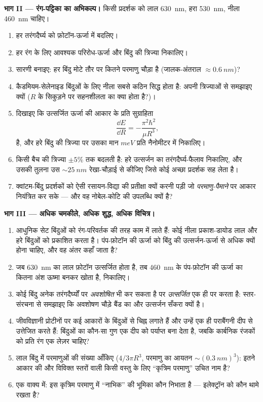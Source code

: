 \begin{problem}
\medskip\noindent\textbf{भाग II --- रंग-पट्टिका का अभिकल्प।}
किसी प्रदर्शक को लाल \qty{630}{nm}, हरा \qty{530}{nm}, नीला
\qty{460}{nm} चाहिए।
\begin{enumerate}[resume]
  \item हर तरंगदैर्घ्य को फ़ोटॉन-ऊर्जा में बदलिए।
  \item हर रंग के लिए आवश्यक परिरोध-ऊर्जा और बिंदु की त्रिज्या
        निकालिए।
  \item सारणी बनाइए: हर बिंदु मोटे तौर पर कितने परमाणु चौड़ा है
        (जालक-अंतराल $\approx \qty{0.6}{nm}$)?
  \item कैडमियम-सेलेनाइड बिंदुओं के लिए नीला सबसे कठिन सिद्ध होता है:
        अपनी त्रिज्याओं से समझाइए क्यों ($R$ के सिकुड़ने पर सहनशीलता
        का क्या होता है?)।
  \item दिखाइए कि उत्सर्जित ऊर्जा की आकार के प्रति सुग्राहिता
        \[
        \frac{\dd E}{\dd R} = -\frac{\pi^2\hbar^2}{\mu R^3} ,
        \]
        है, और हरे बिंदु की त्रिज्या पर उसका मान $\unit{meV}$ प्रति
        नैनोमीटर में निकालिए।
  \item किसी बैच की त्रिज्या $\pm5\%$ तक बदलती है: हरे उत्सर्जन का
        तरंगदैर्घ्य-फैलाव निकालिए, और उसकी तुलना उस
        $\sim\qty{25}{nm}$ रेखा-चौड़ाई से कीजिए जिसे कोई अच्छा
        प्रदर्शक सह लेता है।
  \item क्वांटम-बिंदु प्रदर्शकों को ऐसी रसायन-विद्या की प्रतीक्षा
        क्यों करनी पड़ी जो \emph{परमाणु-पैमाने} पर आकार नियंत्रित कर
        सके --- और वह नोबेल-कोटि की उपलब्धि क्यों है?
\end{enumerate}

\medskip\noindent\textbf{भाग III --- अधिक चमकीले, अधिक शुद्ध, अधिक विचित्र।}
\begin{enumerate}[resume]
  \item आधुनिक सेट बिंदुओं को रंग-परिवर्तक की तरह काम में लाते हैं:
        कोई नीला प्रकाश-डायोड लाल और हरे बिंदुओं को प्रकाशित करता है।
        पंप-फ़ोटॉन की ऊर्जा को बिंदु की उत्सर्जन-ऊर्जा से अधिक क्यों
        होना चाहिए, और वह अंतर कहाँ जाता है?
  \item जब \qty{630}{nm} का लाल फ़ोटॉन उत्सर्जित होता है, तब
        \qty{460}{nm} के पंप-फ़ोटॉन की ऊर्जा का कितना अंश ऊष्मा बनकर
        खोता है, निकालिए।
  \item कोई बिंदु अनेक तरंगदैर्घ्यों पर \emph{अवशोषित} भी कर सकता है
        पर \emph{उत्सर्जित} एक ही पर करता है: स्तर-संरचना से समझाइए
        कि अवशोषण चौड़े बैंड का और उत्सर्जन सँकरा क्यों है।
  \item जीवविज्ञानी प्रोटीनों पर कई आकारों के बिंदुओं से चिह्न लगाते
        हैं और उन्हें एक ही पराबैंगनी दीप से उत्तेजित करते हैं:
        बिंदुओं का कौन-सा गुण एक दीप को पर्याप्त बना देता है, जबकि
        कार्बनिक रंजकों को प्रति रंग एक लेज़र चाहिए?
  \item लाल बिंदु में परमाणुओं की संख्या आँकिए ($4/3\pi R^3$,
        परमाणु का आयतन $\sim(\qty{0.3}{nm})^3$): इतने आकार की और
        विविक्त स्तरों वाली किसी वस्तु के लिए ``कृत्रिम परमाणु''
        उचित नाम है?
  \item एक वाक्य में: इस कृत्रिम परमाणु में ``नाभिक'' की भूमिका कौन
        निभाता है --- इलेक्ट्रॉन को कौन थामे रखता है?
\end{enumerate}


\end{problem}
